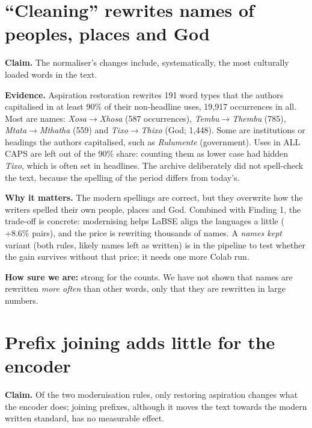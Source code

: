 \documentclass[11pt,a4paper]{article}
\newcommand{\strength}[1]{\par\noindent\textbf{How sure we are:} #1\par}
\newcommand{\claim}[1]{\par\smallskip\noindent\colorbox{black!6}{\parbox{\dimexpr\linewidth-2\fboxsep}{\textbf{Claim.} #1}}\par\smallskip}
\begin{document}
\section{``Cleaning'' rewrites names of peoples, places and God}
\claim{The normaliser's changes include, systematically, the most culturally loaded words in the text.}

\textbf{Evidence.} Aspiration restoration rewrites 191 word types that the authors capitalised in at
least 90\% of their non-headline uses, 19{,}917 occurrences in all. Most are names: \emph{Xosa}$\to$\emph{Xhosa}
(587 occurrences), \emph{Tembu}$\to$\emph{Thembu} (785), \emph{Mtata}$\to$\emph{Mthatha} (559) and
\emph{Tixo}$\to$\emph{Thixo} (God; 1{,}448). Some are institutions or headings the authors capitalised,
such as \emph{Rulumente} (government). Uses in ALL CAPS are left out of the 90\% share: counting them
as lower case had hidden \emph{Tixo}, which is often set in headlines. The archive deliberately did not spell-check
the text, because the spelling of the period differs from today's.

\textbf{Why it matters.} The modern spellings are correct, but they overwrite how the writers spelled
their own people, places and God. Combined with Finding 1, the trade-off is concrete: modernising helps
LaBSE align the languages a little ($+8.6\%$ pairs), and the price is rewriting thousands of names. A
\emph{names kept} variant (both rules, likely names left as written) is in the pipeline to test whether
the gain survives without that price; it needs one more Colab run.

\strength{strong for the counts. We have not shown that names are rewritten \emph{more often} than other
words, only that they are rewritten in large numbers.}

\section{Prefix joining adds little for the encoder}
\claim{Of the two modernisation rules, only restoring aspiration changes what the encoder does; joining
prefixes, although it moves the text towards the modern written standard, has no measurable effect.}
\end{document}
